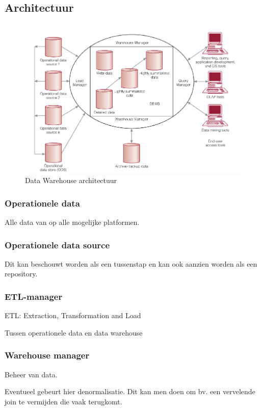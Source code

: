 \documentclass[a4paper,12pt]{article}
\begin{document}
\subsection{Architectuur}
\begin{figure}[H]
\centering
  \includegraphics[width=.9\linewidth]{img/DWArchitectuur.png}
  \caption{Data Warehouse architectuur}
  \label{fig:DWArchitectuur}
\end{figure}

\subsubsection{Operationele data}
Alle data van op alle mogelijke platformen.

\subsubsection{Operationele data source}
Dit kan beschouwt worden als een tussenstap en kan ook aanzien worden als een repository.

\subsubsection{ETL-manager}
ETL: Extraction, Transformation and Load

Tussen operationele data en data warehouse

\subsubsection{Warehouse manager}
Beheer van data.

Eventueel gebeurt hier denormalisatie.
Dit kan men doen om bv. een vervelende join te vermijden die vaak terugkomt.
\end{document}
